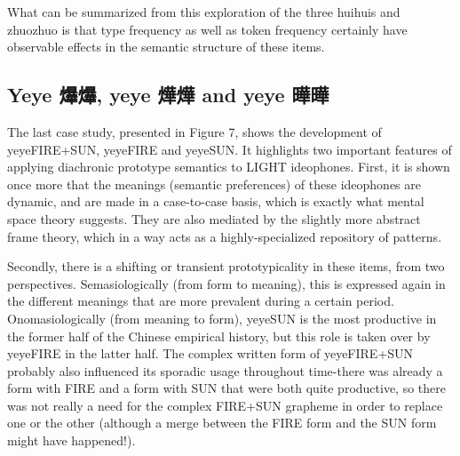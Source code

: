 \documentclass[12pt,article,oneside]{memoir}
\theoremstyle{definition}
\theoremstyle{definition}
\theoremstyle{definition}
\theoremstyle{remark}
\begin{document}
What can be summarized from this exploration of the three huihuis and
zhuozhuo is that type frequency as well as token frequency certainly
have observable effects in the semantic structure of these items.

\subsection{Yeye 爗爗, yeye 燁燁 and yeye
曄曄}\label{yeye--yeye--and-yeye-}

The last case study, presented in Figure 7, shows the development of
yeyeFIRE+SUN, yeyeFIRE and yeyeSUN. It highlights two important features
of applying diachronic prototype semantics to LIGHT ideophones. First,
it is shown once more that the meanings (semantic preferences) of these
ideophones are dynamic, and are made in a case-to-case basis, which is
exactly what mental space theory suggests. They are also mediated by the
slightly more abstract frame theory, which in a way acts as a
highly-specialized repository of patterns.

Secondly, there is a shifting or transient prototypicality in these
items, from two perspectives. Semasiologically (from form to meaning),
this is expressed again in the different meanings that are more
prevalent during a certain period. Onomasiologically (from meaning to
form), yeyeSUN is the most productive in the former half of the Chinese
empirical history, but this role is taken over by yeyeFIRE in the latter
half. The complex written form of yeyeFIRE+SUN probably also influenced
its sporadic usage throughout time-there was already a form with FIRE
and a form with SUN that were both quite productive, so there was not
really a need for the complex FIRE+SUN grapheme in order to replace one
or the other (although a merge between the FIRE form and the SUN form
might have happened!).
\end{document}
